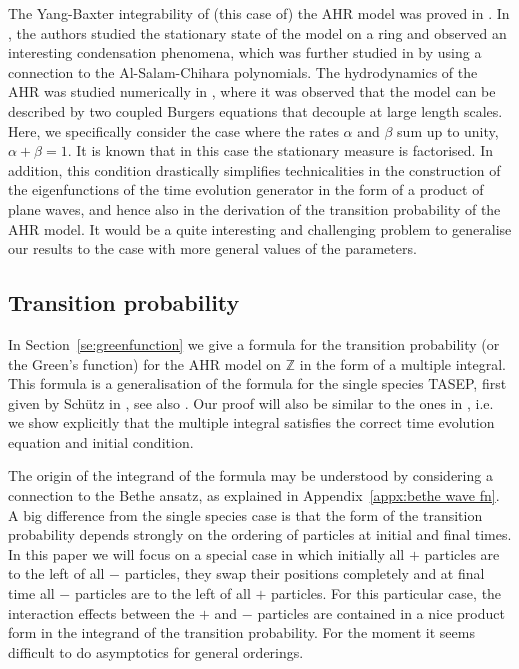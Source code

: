 \documentclass[cmp]{svjour}
\numberwithin{theorem}{section}
\numberwithin{equation}{section}
\begin{document}
The Yang-Baxter integrability of (this case of) the AHR model was proved in \cite{C2008}. In \cite{AHR-ptv}, the authors studied the stationary state of the model on a ring and observed an interesting condensation phenomena\cite{AHR1-ptv,AHR2-ptv}, which was further studied in  \cite{RSS2000} by using a connection to the Al-Salam-Chihara polynomials.
The hydrodynamics of the AHR was studied numerically in \cite{kim2007dynamic}, where it was observed that the model can be described by two coupled Burgers equations that decouple at large length scales.
Here, we specifically consider the case where the rates $\alpha$ and $\beta$ sum up to unity, $\alpha+\beta=1$.
It is known that in this case the stationary measure is factorised. In addition, this condition drastically simplifies technicalities in the
construction of the eigenfunctions of the time evolution generator in the form of a product of plane waves, and hence also in the derivation of the transition probability of the AHR model. It would be a quite interesting and challenging problem to generalise our results to the case with more general values of the parameters. 

\subsection{Transition probability}
In Section~\ref{se:greenfunction} we give a formula for the transition probability (or the Green's function) for the AHR model on $\mathbb{Z}$ in the form of a multiple integral.
This formula is a generalisation of the formula for the single species TASEP, first given by
Sch\"utz in \cite{S1997}, see also \cite{tracy2008integral}. Our proof will also be similar to the ones in \cite{S1997,tracy2008integral}, i.e. we
show explicitly that the multiple integral satisfies the correct time evolution equation and initial condition.

The origin of the integrand of the formula may be understood by considering a connection to the Bethe ansatz, as explained in Appendix~\ref{appx:bethe wave fn}.
A big difference from the single species case is that the form of the transition probability depends strongly on
the ordering of particles at initial and final times. In this paper we will focus on a special case
in which initially all $+$ particles are to the left of all $-$ particles, they swap their positions completely and at final
time all $-$ particles are to the left of all $+$ particles. For this particular case, the interaction effects between the $+$
and $-$ particles are contained in a nice product form in the integrand of the transition probability.
For the moment it seems difficult to do asymptotics for general orderings.
\end{document}
